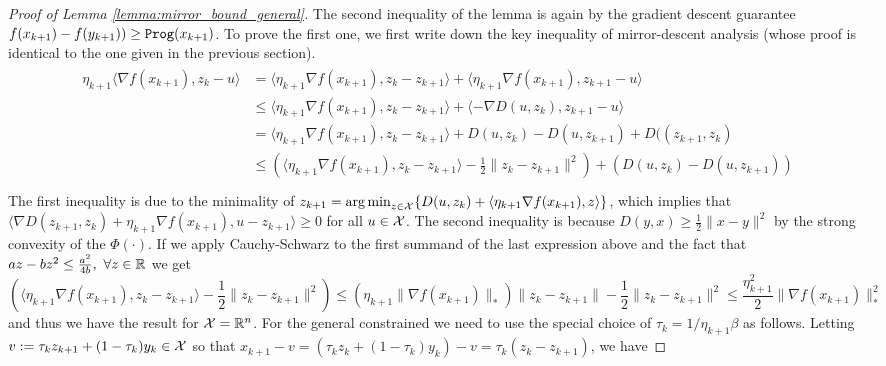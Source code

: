 \begin{proof}[Proof of Lemma \ref{lemma:mirror_bound_general}]
    The second inequality of the lemma is again by the gradient descent guarantee $f(x_{k+1}) - f(y_{k+1})) \geq {\tt{Prog}}(x_{k+1})$. To prove the first one, we first write down the key inequality of mirror-descent analysis (whose proof is identical to the one given in the previous section). 
\begin{align*}\label{actual_regret_linear_coupling}
    \begin{aligned}
        \eta_{k+1} \langle \nabla f(x_{k+1}), z_{k} - u \rangle &= \langle \eta_{k+1} \nabla f(x_{k+1}), z_k - z_{k+1} \rangle + \langle \eta_{k+1} \nabla f(x_{k+1}), z_{k+1} - u \rangle \\
                                                                &\leq  \langle \eta_{k+1} \nabla f(x_{k+1}), z_k - z_{k+1} \rangle + \langle -\nabla D(u, {z_k}), z_{k+1} - u \rangle \\
                                                                &=  \langle \eta_{k+1} \nabla f(x_{k+1}), z_k - z_{k+1} \rangle + D(u, {z_k}) - D(u, z_{k+1}) + D((z_{k+1}, {z_k}) \\
                                                                &\leq  \left( \langle \eta_{k+1} \nabla f(x_{k+1}), z_k - z_{k+1} \rangle - \frac{1}{2}\|z_k - z_{k+1}\|^2 \right)  +  \left( D(u, {z_k}) - D(u, z_{k+1}) \right) \\
    \end{aligned}
\end{align*}
The first inequality is due to the minimality of $z_{k+1} = \operatorname*{arg\,min}_{z\in\mathcal{X}} \{D(u, {z_k}) + \langle \eta_{k+1} \nabla f(x_{k+1}), z \rangle\}$, which implies that  $\langle \nabla D(z_{k+1}, {z_k} ) + \eta_{k+1} \nabla f(x_{k+1}), u-z_{k+1} \rangle \geq 0 $ for all $u \in \mathcal{X}$. The second inequality is because $D(y, x) \geq \frac{1}{2} \|x-y\|^2$ by the strong convexity of the $\Phi(\cdot)$. If we apply Cauchy-Schwarz to the first summand of the last expression above and the fact that $az-bz^2 \leq \frac{a^2}{4b}, \ \forall z \in \mathbb{R}$ we get
\[
    \left( \langle \eta_{k+1} \nabla f(x_{k+1}), z_k - z_{k+1} \rangle - \frac{1}{2}\|z_k - z_{k+1}\|^2 \right) \leq \left(\eta_{k+1}\|\nabla f(x_{k+1})\|_\ast \right) \|z_k - z_{k+1}\| - \frac{1}{2}\|z_k - z_{k+1}\|^2 \leq \frac{\eta_{k+1}^2}{2} \|\nabla f(x_{k+1})\|_\ast^2
\]
and thus we have the result for $\mathcal{X} = \mathbb{R}^n$. For the general constrained we need to use the special choice of $\tau_k = 1/\eta_{k+1} \beta$ as follows. Letting $v:= \tau_k z_{k+1} + (1-\tau_k) y_k \in \mathcal{X}$ so that $x_{k+1} - v = (\tau_k z_k + (1-\tau_k)y_k) -v = \tau_k(z_k-z_{k+1})$, we have

\end{proof}
